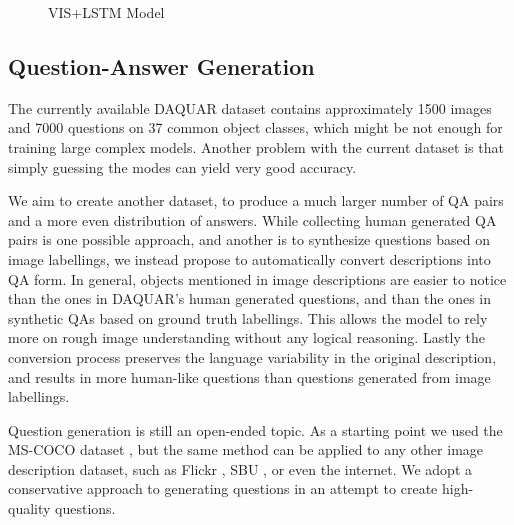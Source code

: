 \documentclass{article} %
\renewcommand{\#}[1]{\textbf{#1}}
\begin{document}
\begin{figure}
\centering
\scalebox{0.6}{
}
\caption{VIS+LSTM Model}
\label{fig:imgword}
\end{figure}

\subsection{Question-Answer Generation}
The currently available DAQUAR dataset contains approximately 1500 images and
7000 questions on 37 common object classes, which might be not enough for
training large complex models. Another problem with the current dataset is
that simply guessing the modes can yield very good accuracy. 

We aim to create
another dataset, to produce a much larger number of QA pairs and a more even
distribution of answers. While collecting human generated QA pairs is one
possible approach, and another is to synthesize questions based on image
labellings, we instead propose to automatically convert descriptions 
into QA form. 
In general, objects mentioned in image
descriptions are easier to notice than the ones in DAQUAR's human generated 
questions, and than the ones in synthetic QAs based on ground truth
labellings. 
This allows the 
model to rely more on rough image understanding without any 
logical reasoning. Lastly the conversion process preserves the language variability 
in the original description, and results in more human-like questions than 
questions generated from image labellings.

Question generation is still an open-ended topic.
As a starting point we used the MS-COCO dataset
\cite{mscoco}, but the same method can be applied to any other image
description dataset, such as Flickr \cite{flickr8k}, SBU \cite{ordonez11}, or
even the internet. 
We adopt a conservative approach to generating questions
in an attempt to create high-quality questions.
\end{document}
